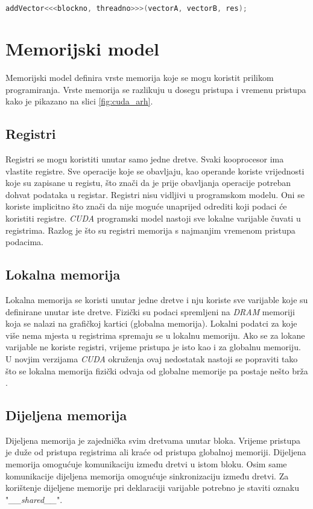 \documentclass[times, utf8, zavrsni, numeric, sort]{fer}
\begin{document}
\begin{singlespace}
\begin{lstlisting}[caption={Poziv funkcije na grafičkoj kartici},label=	{kod:cuda-kernel}, language = {C}]
  		addVector<<<blockno, threadno>>>(vectorA, vectorB, res);

\end{lstlisting}

\end{singlespace}


\section{Memorijski model}
Memorijski model definira vrste memorija koje se mogu koristit prilikom programiranja. Vrste memorija se razlikuju u dosegu pristupa i vremenu pristupa kako je pikazano na slici \ref{fig:cuda_arh}.

\subsection{Registri}
Registri se mogu koristiti unutar samo jedne dretve. Svaki kooprocesor ima vlastite registre. Sve operacije koje se obavljaju, kao operande koriste vrijednosti koje su zapisane u registu, što znači da je prije obavljanja operacije potreban dohvat podataka u registar. Registri nisu vidljivi u programskom modelu. Oni se koriste implicitno što znači da nije moguće unaprijed odrediti koji podaci će koristiti registre. \emph{CUDA} programski model nastoji sve lokalne varijable čuvati u registrima. Razlog je što su registri memorija s najmanjim vremenom pristupa podacima.

\subsection{Lokalna memorija}
Lokalna memorija se koristi unutar jedne dretve i nju koriste sve varijable koje su definirane unutar iste dretve. Fizički su podaci spremljeni na \emph{DRAM} memoriji koja se nalazi na grafičkoj kartici (globalna memorija). Lokalni podatci za koje više nema mjesta u registrima spremaju se u lokalnu memoriju. Ako se za lokane varijable ne koriste registri, vrijeme pristupa je isto kao i za globalnu memoriju. U novjim verzijama \emph{CUDA} okruženja ovaj nedostatak nastoji se popraviti tako što se lokalna memorija fizički odvaja od globalne memorije pa postaje nešto brža \cite{CUDAHOME}.

\subsection{Dijeljena memorija}
Dijeljena memorija je zajednička svim dretvama unutar bloka. Vrijeme pristupa je duže od pristupa registrima ali kraće od pristupa globalnoj memoriji. Dijeljena memorija omogućuje komunikaciju između dretvi u istom bloku. Osim same komunikacije dijeljena memorija omogućuje sinkronizaciju između dretvi. Za korištenje dijeljene memorije pri deklaraciji varijable potrebno je staviti oznaku "\emph{\_\_shared\_\_}".
\end{document}
